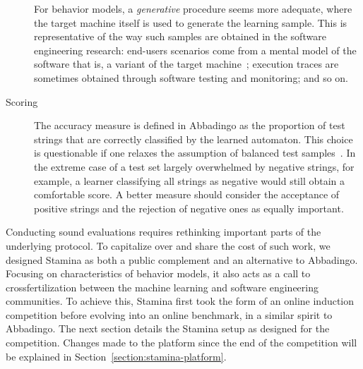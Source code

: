 \begin{description}
For behavior models, a \emph{generative} procedure seems more adequate, where the target machine itself is used to generate the learning sample. This is representative of the way such samples are obtained in the software engineering research: end-users scenarios come from a mental model of the software that is, a variant of the target machine~\cite{Combefis:2011}; execution traces are sometimes obtained through software testing and monitoring; and so on.

\item[Scoring] The accuracy measure is defined in Abbadingo as the proportion of test strings that are correctly classified by the learned automaton. This choice is questionable if one relaxes the assumption of balanced test samples~\cite{Walkinshaw:2008}. In the extreme case of a test set largely overwhelmed by negative strings, for example, a learner classifying all strings as negative would still obtain a comfortable score. A better measure should consider the acceptance of positive strings and the rejection of negative ones as equally important. 
\end{description}

Conducting sound evaluations requires rethinking important parts of the underlying protocol. To capitalize over and share the cost of such work, we designed Stamina as both a public complement and an alternative to Abbadingo. Focusing on characteristics of behavior models, it also acts as a call to crossfertilization between the machine learning and software engineering communities. To achieve this, Stamina first took the form of an online induction competition before evolving into an online benchmark, in a similar spirit to Abbadingo. The next section details the Stamina setup as designed for the competition. Changes made to the platform since the end of the competition will be explained in Section~\ref{section:stamina-platform}.
